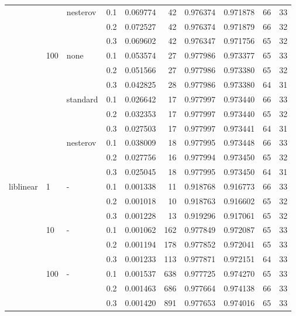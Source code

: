 \begin{table}[H]
\begin{tabular}{llllrrrrrr}
          &     & nesterov & 0.1 &  0.069774 &      42 &  0.976374 &  0.971878 &          66 &        33 \\
          &     &   & 0.2 &  0.072527 &      42 &  0.976374 &  0.971879 &          66 &        32 \\
          &     &   & 0.3 &  0.069602 &      42 &  0.976347 &  0.971756 &          65 &        32 \\
          & 100 & none & 0.1 &  0.053574 &      27 &  0.977986 &  0.973377 &          65 &        33 \\
          &     &   & 0.2 &  0.051566 &      27 &  0.977986 &  0.973380 &          65 &        32 \\
          &     &   & 0.3 &  0.042825 &      28 &  0.977986 &  0.973380 &          64 &        31 \\
          &     & standard & 0.1 &  0.026642 &      17 &  0.977997 &  0.973440 &          66 &        33 \\
          &     &   & 0.2 &  0.032353 &      17 &  0.977997 &  0.973440 &          65 &        32 \\
          &     &   & 0.3 &  0.027503 &      17 &  0.977997 &  0.973441 &          64 &        31 \\
          &     & nesterov & 0.1 &  0.038009 &      18 &  0.977995 &  0.973448 &          66 &        33 \\
          &     &   & 0.2 &  0.027756 &      16 &  0.977994 &  0.973450 &          65 &        32 \\
          &     &   & 0.3 &  0.025045 &      18 &  0.977995 &  0.973450 &          64 &        31 \\
liblinear & 1   & - & 0.1 &  0.001338 &      11 &  0.918768 &  0.916773 &          66 &        33 \\
          &     &   & 0.2 &  0.001018 &      10 &  0.918763 &  0.916602 &          65 &        32 \\
          &     &   & 0.3 &  0.001228 &      13 &  0.919296 &  0.917061 &          65 &        32 \\
          & 10  & - & 0.1 &  0.001062 &     162 &  0.977849 &  0.972087 &          65 &        33 \\
          &     &   & 0.2 &  0.001194 &     178 &  0.977852 &  0.972041 &          65 &        33 \\
          &     &   & 0.3 &  0.001233 &     113 &  0.977871 &  0.972151 &          64 &        33 \\
          & 100 & - & 0.1 &  0.001537 &     638 &  0.977725 &  0.974270 &          65 &        33 \\
          &     &   & 0.2 &  0.001463 &     686 &  0.977664 &  0.974138 &          66 &        33 \\
          &     &   & 0.3 &  0.001420 &     891 &  0.977653 &  0.974016 &          65 &        33 \\
\bottomrule
\end{tabular}
\end{table}

